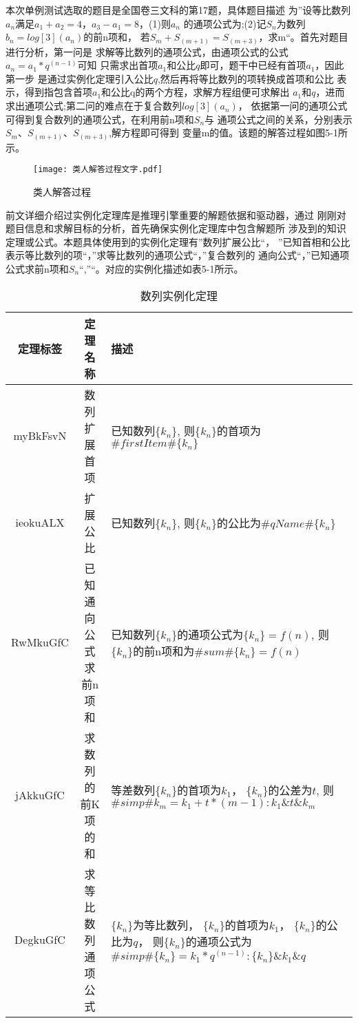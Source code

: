 \documentclass{standalone}
\begin{document}
本次单例测试选取的题目是全国卷三文科的第17题，具体题目描述
为”设等比数列${a_n}$满足$a_1+a_2=4$，$a_3-a_1=8$，(1)则${a_n}$
的通项公式为;(2)记$S_n$为数列$b_n={log[3](a_n)}$的前n项和，
若$S_m+S_(m+1)=S_(m+3)$，求m“。首先对题目进行分析，第一问是
求解等比数列的通项公式，由通项公式的公式$a_n=a_1*q^(n-1)$可知
只需求出首项$a_1$和公比$q$即可，题干中已经有首项$a_1$，因此第一步
是通过实例化定理引入公比$q$,然后再将等比数列的项转换成首项和公比
表示，得到指包含首项$a_1$和公比q的两个方程，求解方程组便可求解出
$a_1$和$q$，进而求出通项公式;第二问的难点在于复合数列${log[3](a_n)}$，
依据第一问的通项公式可得到复合数列的通项公式，在利用前n项和$S_n$与
通项公式之间的关系，分别表示$S_m$、$S_(m+1)$、$S_(m+3)$,解方程即可得到
变量m的值。该题的解答过程如图5-1所示。
\begin{figure}[htbp]
	\texttt{[image: 类人解答过程文字.pdf]}
	\caption{类人解答过程}
	\label{类人解答过程文字}
\end{figure}
前文详细介绍过实例化定理库是推理引擎重要的解题依据和驱动器，通过
刚刚对题目信息和求解目标的分析，首先确保实例化定理库中包含解题所
涉及到的知识定理或公式。本题具体使用到的实例化定理有”数列扩展公比“，
”已知首相和公比表示等比数列的项“，”求等比数列的通项公式“，”复合数列的
通向公式“，”已知通项公式求前n项和$S_n$“,”“。对应的实例化描述如表5-1所示。
\begin{table}[h]
	\caption{数列实例化定理} 
	\begin{tabular}{|c|c|l|} 
		\hline  
		定理标签 & 定理名称 & 描述 \\
		\hline  
		myBkFsvN & 数列扩展首项
		& \makecell[l]{已知数列$\{k_n\}$,\\则$\{k_n\}$的首项为$\#firstItem\#\{k_n\}$}\\  
		\hline  
		ieokuALX & 扩展公比
		& \makecell[l]{已知数列$\{k_n\}$,\\则$\{k_n\}$的公比为$\#qName\#\{k_n\}$}\\ 
		\hline  
		RwMkuGfC & 已知通向公式求前n项和
		& \makecell[l]{已知数列$\{k_n\}$的通项公式为$\{k_n\}=f(n)$,\\则$\{k_n\}$的前n项和为$\#sum\#\{k_n\}=f(n)$}\\ 
		\hline  
		jAkkuGfC & 求数列的前K项的和 
		& \makecell[l]{等差数列$\{k_n\}$的首项为$k_1$，\\$\{k_n\}$的公差为$t$,\\则$\#simp\#k_m=k_1+t*(m-1):k_1\&t\&k_m$}\\  
		\hline 
		 DegkuGfC & 求等比数列通项公式  
		& \makecell[l]{$\{k_n\}$为等比数列，\\$\{k_n\}$的首项为$k_1$，\\$\{k_n\}$的公比为$q$，\\则$\{k_n\}$的通项公式为$\#simp\#\{k_n\}=k_1*q^(n-1):\{k_n\}\&k_1\&q$}\\  
		\hline 
	\end{tabular}
	\label{tablea}
\end{table}
\end{document}

